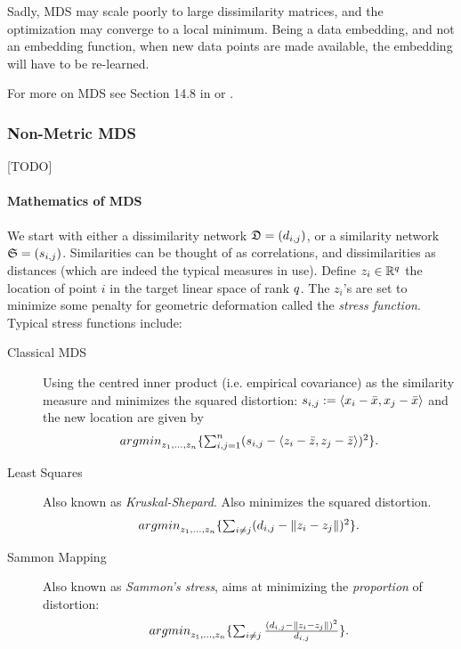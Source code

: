 \documentclass[12pt,a4paper]{article}
\begin{document}
Sadly, MDS may scale poorly to large dissimilarity matrices, and the optimization may converge to a local minimum.
Being a data embedding, and not an embedding function, when new data points are made available, the embedding will have to be re-learned.

For more on MDS see Section 14.8 in \cite{hastie_elements_2003} or \cite{borg_modern_2005}.



\subsubsection{Non-Metric MDS}
[TODO]


\paragraph{Mathematics of MDS}
We start with either a dissimilarity network $\mathfrak{D}=(d_{i,j})$, or a similarity network $\mathfrak{S}=(s_{i,j})$.
Similarities can be thought of as correlations, and dissimilarities as distances (which are indeed the typical measures in use).
Define $z_i \in \mathbb{R}^q$ the location of point $i$ in the target linear space of rank $q$. 
The $z_i$'s are set to minimize some penalty for geometric deformation called the \emph{stress function}.
Typical stress functions include:
\begin{description}
	
	\item[Classical MDS] Using the centred inner product (i.e. empirical covariance) as the similarity measure and minimizes the squared distortion:
	$s_{i,j}:= \left< x_i-\bar x,x_j-\bar{x} \right>$ and the new location are given by
	\begin{align}
	\label{eq:mds_classical}
	\textstyle{\mathop{argmin}_{z_1,\dots,z_n}}\{ \sum_{i,j=1}^{n} (s_{i,j}-\left< z_i-\bar z,z_j-\bar{z} \right> )^2 \}.
	\end{align}
	
	\item[Least Squares] Also known as \emph{Kruskal-Shepard}. Also minimizes the squared distortion. 
	\begin{align}
	\label{eq:mds_stress}
	\textstyle{\mathop{argmin}_{z_1,\dots,z_n}}\{ \sum_{i \neq j} (d_{i,j}-\Vert z_i-z_j \Vert )^2 \}.
	\end{align}
	
	\item[Sammon Mapping] Also known as \emph{Sammon's stress}, aims at minimizing the \emph{proportion} of distortion:
	\begin{align}
	\label{eq:mds_sammon}
	\textstyle{\mathop{argmin}_{z_1,\dots,z_n}}\{ \sum_{i \neq j} \frac{(d_{i,j}-\Vert z_i-z_j \Vert )^2}{d_{i,j}} \}.
	\end{align}
	
\end{description}
\end{document}
